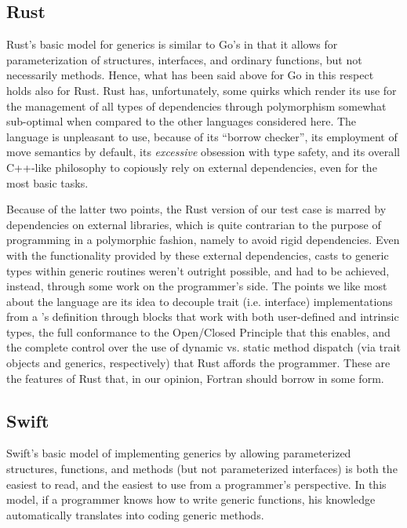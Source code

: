 \documentclass[11pt,oneside]{report}
\newcommand{\code}[1]{{\selectfont\ttfamily{#1}}}
\begin{document}
\subsection{Rust}

Rust's basic model for generics is similar to Go's in that it allows
for parameterization of structures, interfaces, and ordinary
functions, but not necessarily methods. Hence, what has been said
above for Go in this respect holds also for Rust. Rust has,
unfortunately, some quirks which render its use for the management of
all types of dependencies through polymorphism somewhat sub-optimal
when compared to the other languages considered here. The language is
unpleasant to use, because of its ``borrow checker'', its employment
of move semantics by default, its \emph{excessive} obsession with type
safety, and its overall C++-like philosophy to copiously rely on
external dependencies, even for the most basic tasks.

Because of the latter two points, the Rust version of our test case is
marred by dependencies on external libraries, which is quite
contrarian to the purpose of programming in a polymorphic fashion,
namely to avoid rigid dependencies. Even with the functionality
provided by these external dependencies, casts to generic types within
generic routines weren't outright possible, and had to be achieved,
instead, through some work on the programmer's side. The points we
like most about the language are its idea to decouple trait
(i.e. interface) implementations from a \code{struct}'s definition
through \code{impl} blocks that work with both user-defined and
intrinsic types, the full conformance to the Open/Closed Principle
that this enables, and the complete control over the use of dynamic
vs. static method dispatch (via trait objects and generics,
respectively) that Rust affords the programmer. These are the features
of Rust that, in our opinion, Fortran should borrow in some form.

\subsection{Swift}

Swift's basic model of implementing generics by allowing parameterized
structures, functions, and methods (but not parameterized interfaces)
is both the easiest to read, and the easiest to use from a
programmer's perspective. In this model, if a programmer knows how to
write generic functions, his knowledge automatically translates into
coding generic methods.
\end{document}
